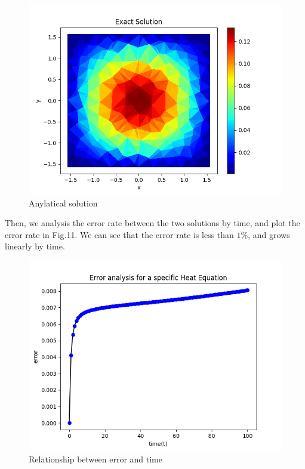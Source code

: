 \documentclass[conference]{IEEEtran}
\begin{document}
    \begin{figure}[H]
        \centering
        \includegraphics[scale=0.4]{../fig/sp_exact.png}
        \caption{Anylatical solution}
    \end{figure}

    Then, we analysis the error rate between the two solutions by time, and plot the error rate in Fig.11.
    We can see that the error rate is less than $1\%$, and grows linearly by time.
    \begin{figure}[H]
        \centering
        \includegraphics[scale=0.4]{../fig/err.png}
        \caption{Relationship between error and time }
    \end{figure}
\end{document}
